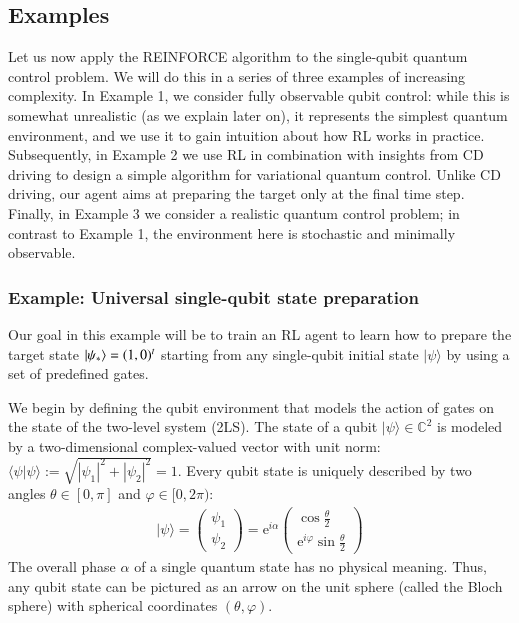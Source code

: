 \subsection{Examples}

Let us now apply the REINFORCE algorithm to the single-qubit quantum control problem. We will do this in a series of three examples of increasing complexity. 
In Example 1, we consider fully observable qubit control: while this is somewhat unrealistic (as we explain later on), it represents the simplest quantum environment, and we use it to gain intuition about how RL works in practice. 
Subsequently, in Example 2 we use RL in combination with insights from CD driving to design a simple algorithm for variational quantum control. Unlike CD driving, our agent aims at preparing the target only at the final time step. 
Finally, in Example 3 we consider a realistic quantum control problem; in contrast to Example 1, the environment here is stochastic and minimally observable.

\subsubsection{\label{sec:RL_1q}Example: Universal single-qubit state preparation}

Our goal in this example will be to train an RL agent to learn how to prepare the target state $\ket{\psi_\ast}=(1,0)^t$ starting from any single-qubit initial state $|\psi\rangle$ by using a set of predefined gates.

We begin by defining the qubit environment that models the action of gates on the state of the two-level system (2LS).
The state of a qubit $|\psi\rangle\in\mathbb{C}^2$ is modeled by a two-dimensional complex-valued vector with unit norm: $\langle\psi|\psi\rangle:=\sqrt{|\psi_1|^2+|\psi_2|^2}=1$. Every qubit state is uniquely described by two angles $\theta\in[0,\pi]$ and $\varphi\in[0,2\pi)$:
\begin{eqnarray}
\label{eq:blochsphere_state}
|\psi\rangle=
\begin{pmatrix}
\psi_1 \\ \psi_2
\end{pmatrix}=
\mathrm{e}^{i\alpha}
\begin{pmatrix}
\cos\frac{\theta}{2} \\
\mathrm{e}^{i\varphi}\sin\frac{\theta}{2}
\end{pmatrix}
\end{eqnarray}
The overall phase $\alpha$ of a single quantum state has no physical meaning.
Thus, any  qubit state can be pictured as an arrow on the unit sphere (called the Bloch sphere) with spherical coordinates $(\theta,\varphi)$. 

